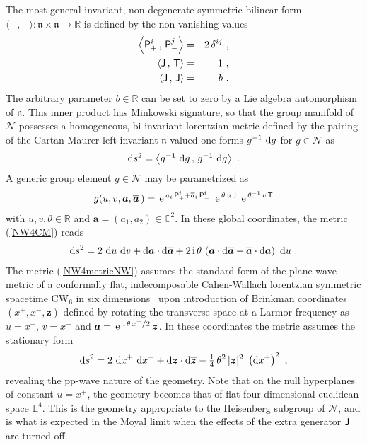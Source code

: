 \documentclass[11pt,a4paper]{article}
\def\nn{\nonumber}
\newcommand{\1}{\mathbb{1}}
\newcommand{\mbf}[1]{{\boldsymbol {#1} }}
\def\ii{{\,{\rm i}\,}}
\def\dd{{\rm d}}
\def\P{{\sf P}}
\def\T{{\sf T}}
\def\J{{\sf J}}
\def\ma{{\mbf a}}
\def\mz{{\mbf z}}
\newcommand{\complex}{{\mathbb C}} %
\newcommand{\real}{{\mathbb R}} %
\newcommand{\eucl}{{\mathbb E}}
\def\nn{\nonumber}
\def\e{{\,\rm e}\,}
\def\bea{\begin{eqnarray}}
\def\eea{\end{eqnarray}}
\newcommand{\beq}{\begin{eqnarray}}
\newcommand{\eeq}{\end{eqnarray}}
\begin{document}
The most general invariant, non-degenerate symmetric bilinear form
$\langle-,-\rangle:\mathfrak{n}\times\mathfrak{n}\to\real$
is defined by the non-vanishing values~\cite{NW1}
\bea
\left\langle\P^i_+\,,\,\P^j_-\right\rangle&=&2\,\delta^{ij} \ , \nn\\
\left\langle\J\,,\,\T\right\rangle&=&1 \ , \nn\\
\left\langle\J\,,\,\J\right\rangle&=&b \ .
\label{NW4innerprod}\eea
The arbitrary parameter $b\in\real$ can be set to zero by a Lie
algebra automorphism of $\mathfrak{n}$. This inner product has
Minkowski signature, so that the
group manifold of $\mathcal N$ possesses a
homogeneous, bi-invariant lorentzian metric defined by the pairing of
the Cartan-Maurer left-invariant $\mathfrak n$-valued one-forms
$g^{-1}~\dd g$ for $g\in\mathcal N$ as
\beq
\dd s^2=\left\langle g^{-1}~\dd g\,,\,g^{-1}~\dd g\right\rangle \ .
\label{NW4CM}\eeq
A generic group element $g\in\mathcal N$ may be parametrized as
\beq
g(u,v,\ma,\overline{\ma}\,)=\e^{a_i\,\P^i_++\overline{a}_i
\,\P^i_-}~\e^{\theta\,u\,\J}~\e^{\theta^{-1}\,v\,\T}
\label{NW4coords}\eeq
with $u,v,\theta\in\real$ and $\ma=(a_1,a_2)\in\complex^2$. In these
global coordinates, the metric (\ref{NW4CM}) reads
\beq
\dd s^2=2~\dd u~\dd v+\dd\ma\cdot\dd\overline{\ma}+2\ii\theta\,\left(\ma\cdot
\dd\overline{\ma}-\overline{\ma}\cdot\dd\ma\right)~\dd u \ .
\label{NW4metricNW}\eeq
The metric (\ref{NW4metricNW}) assumes the standard form of the plane
wave metric of a conformally flat, indecomposable Cahen-Wallach
lorentzian symmetric spacetime CW$_6$ in six dimensions~\cite{CW1} upon
introduction of Brinkman coordinates~\cite{Brinkman1} $(x^+,x^-,\mz)$
defined by rotating the transverse space at a Larmor frequency as $u=x^+$,
$v=x^-$ and $\ma=\e^{\ii\theta\,x^+/2}\,\mz$. In these coordinates the
metric assumes the stationary form
\beq
\dd s^2=2~\dd x^+~\dd x^-+\dd\mz\cdot\dd\overline{\mz}
-\mbox{$\frac14$}\,\theta^2\,|\mz|^2~
\left(\dd x^+\right)^2 \ ,
\label{NW4metricBrink}\eeq
revealing the pp-wave nature of the geometry. Note that on the null
hyperplanes of constant $u=x^+$, the geometry becomes that of
flat four-dimensional euclidean space $\eucl^4$. This is the geometry
appropriate to the Heisenberg subgroup of $\mathcal{N}$, and is what
is expected in the Moyal limit when the effects of the extra generator
$\J$ are turned off.
\end{document}
